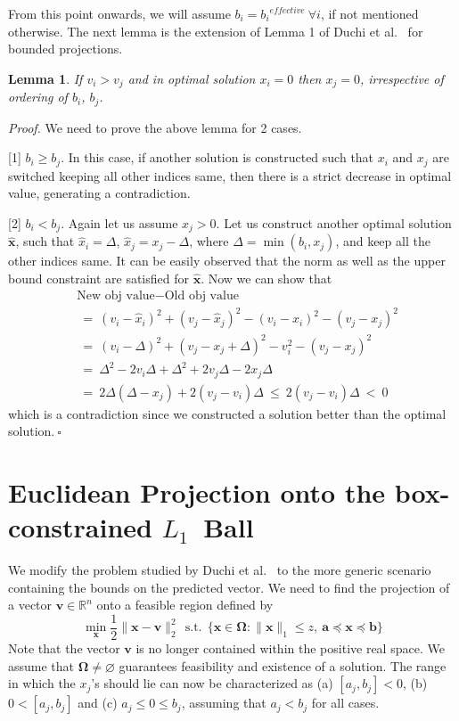 \documentclass{article}
\newcommand{\mathbs}{\boldsymbol}
\newtheorem{lemma}{Lemma}
\def\Lo{$L_1$~}
\begin{document}
From this point onwards, we will assume ${b_i} = {b_i}^{effective}~\forall i$, if not mentioned otherwise.
The next lemma is the extension of Lemma 1 of Duchi et al.~\cite{Duchi08} for bounded projections.
\begin{lemma}\label{Lemma:v_based_zero_constraint_ordering}
If $v_i > v_j$ and in optimal solution $x_i = 0$ then $x_j=0$, irrespective of ordering of $b_i$, $b_j$.
\end{lemma}
\emph{Proof.} We need to prove the above lemma for 2 cases.

[1] $b_i \ge b_j$. In this case, if another solution is constructed such that $x_i$ and $x_j$ are switched keeping all other indices same, then there is a strict decrease in optimal value, generating a contradiction.

[2] $b_i < b_j$. Again let us assume $x_j > 0$. Let us construct another optimal solution $\mathbf{\hat{x}}$, such that $\hat{x}_i = \Delta$, $\hat{x}_j = x_j - \Delta$, where $\Delta = \min(b_i, x_j)$, and keep all the other indices same. It can be easily observed that the norm as well as the upper bound constraint are satisfied for $\mathbf{\hat{x}}$. Now we can show that
\begin{align} \nonumber
 & \textrm{New obj value} - \textrm{Old obj value} \\ \nonumber
 &~=~ (v_i - \hat{x}_i)^2 + (v_j - \hat{x}_j)^2 - (v_i-x_i)^2 - (v_j-x_j)^2 \\ \nonumber
 &~=~ (v_i - \Delta )^2 + (v_j - x_j + \Delta )^2  - v_i^2 - (v_j-x_j)^2 \\ \nonumber
 &~=~ \Delta ^2 - 2v_i \Delta + \Delta ^2 + 2v_j \Delta - 2x_j \Delta \\ \nonumber
 &~=~ 2 \Delta ( \Delta - x_j ) + 2 ( v_j - v_i ) \Delta ~\le~ 2 ( v_j - v_i ) \Delta ~ < ~ 0
\end{align}
which is a contradiction since we constructed a solution better than the optimal solution.$~\square$


\section{Euclidean Projection onto the box-constrained \Lo Ball}\label{SEC:EPL1}
We modify the problem studied by Duchi et al.~\cite{Duchi08} to the more generic scenario containing the bounds on the predicted vector. We need to find the projection of a vector $\mathbf{v} \in \mathbb{R}^n$ onto a feasible region defined by
\begin{equation}\label{Eqn:Min}
      \min_{\mathbf{x}} \frac{1}{2}\|\mathbf{x-v}\|_2^2
  ~~\textrm{s.t.}~~ \{\mathbf{x}\in \mathbs{\Omega}: \|\mathbf{x}\|_1 \le z, ~\mathbf{a} \preccurlyeq \mathbf{x} \preccurlyeq \mathbf{b} \}
\end{equation}
Note that the vector $\mathbf{v}$ is no longer contained within the positive real space. We assume that $\mathbs{\Omega} \ne \varnothing$ guarantees feasibility and existence of a solution.
The range in which the $x_j$'s should lie can now be characterized as (a) $[a_j, b_j] < 0$, (b) $0 < [a_j, b_j]$ and (c) $a_j \le 0 \le b_j$, assuming that $a_j < b_j$ for all cases.
\end{document}
